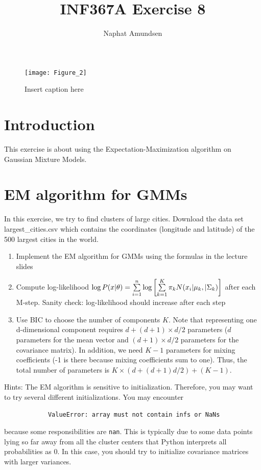 \documentclass[12pt]{article}
\begin{document}
\title{\textbf{INF367A Exercise 8}}
\author{Naphat Amundsen}
\maketitle
\sectionfont{\fontsize{14}{15}\selectfont}
\subsectionfont{\fontsize{12}{15}\selectfont}
\subsubsectionfont{\fontsize{12}{15}\selectfont}
\graphicspath{ {./images/} }

\ifx
\begin{figure}[H]
	\centering
	\texttt{[image: Figure\_2]}
	\caption{Insert caption here}
\end{figure}
\fi

\section*{Introduction}
    This exercise is about using the Expectation-Maximization algorithm on Gaussian Mixture Models.

\section{EM algorithm for GMMs}
    \begin{tcolorbox}[breakable]
        In this exercise, we try to find clusters of large cities. Download the data set largest\_cities.csv which contains the coordinates (longitude and latitude) of the 500 largest cities in the world. 
        
        \begin{enumerate}
            \item Implement the EM algorithm for GMMs using the formulas in the lecture slides 
            \item Compute log-likelihood $\log P(x|\theta) = \sumlim{1}{n} \log \enclb{\sumlim[k]{1}{K}\pi_k N(x_i|\mu_k, |\Sigma_k)}$ after each M-step. Sanity check: log-likelihood should increase after each step 
            \item Use BIC to choose the number of components $K$. Note that representing one d-dimensional component requires $d+(d+1) \times d/2$ parameters ($d$ parameters for the mean vector and $(d+1) \times d/2$ parameters for the covariance matrix). In addition, we need $K-1$ parameters for mixing coefficients (-1 is there because mixing coefficients sum to one). Thus, the total number of parameters is $K \times (d + (d + 1)d/2) + (K - 1).$ 
        \end{enumerate}
        
        Hints: The EM algorithm is sensitive to initialization. Therefore, you may want to try several different initializations. You may encounter 
        \begin{verbatim}
            ValueError: array must not contain infs or NaNs
        \end{verbatim}
        because some responsibilities are \verb|nan|. This is typically due to some data points lying so far away from all the cluster centers that Python interprets all probabilities as $0$. In this case, you should try to initialize covariance matrices with larger variances.

    \end{tcolorbox}
\end{document}
